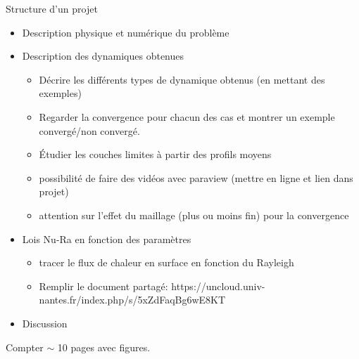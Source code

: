 \documentclass[9pt]{beamer}
\begin{document}
\begin{frame}{Structure d'un projet}
    \begin{itemize}
        \item Description physique et numérique du problème
        \item Description des dynamiques obtenues
        \begin{itemize}
            \item Décrire les différents types de dynamique obtenus (en mettant des exemples)
            \item Regarder la convergence pour chacun des cas et montrer un exemple convergé/non convergé.
            \item Étudier les couches limites à partir des profils moyens
            \item possibilité de faire des vidéos avec paraview (mettre en ligne et lien dans projet)
            \item attention sur l'effet du maillage (plus ou moins fin) pour la convergence
        \end{itemize}
        \item Lois Nu-Ra en fonction des paramètres
        \begin{itemize}
            \item tracer le flux de chaleur en surface en fonction du Rayleigh
            \item Remplir le document partagé: 
            https://uncloud.univ-nantes.fr/index.php/s/5xZdFaqBg6wE8KT
        \end{itemize}
        \item Discussion
    \end{itemize}
    Compter $\sim$ 10 pages avec figures.

\end{frame}

\end{document}
